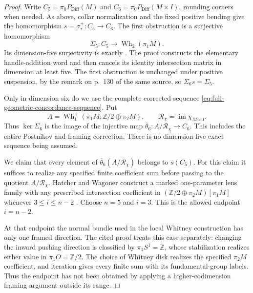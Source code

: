 \begin{proof}
Write $C_5=\pi_0P_{\mathrm{Diff}}(M)$ and
$C_6=\pi_0P_{\mathrm{Diff}}(M\times I)$, rounding corners when
needed. As above, collar normalization and the fixed positive bending
give the homomorphism $s=\sigma^+_*:C_5\to C_6$. The first
obstruction is a surjective homomorphism
\[
 \Sigma_5:C_5\longrightarrow\operatorname{Wh}_2(\pi_1M).
\]
Its dimension-five surjectivity is exactly
\cite[Part~I, Chapter~VI, Theorem~2 and its surjectivity proof,
p.~213]{HatcherWagoner1973}. The proof constructs the elementary
handle-addition word and then cancels its identity intersection
matrix in dimension at least five. The first obstruction is
unchanged under positive suspension, by the remark on p.~130 of
the same source, so $\Sigma_6s=\Sigma_5$.

Only in dimension six do we use the complete corrected sequence
\eqref{eq:full-geometric-concordance-sequence}. Put
\[
 A=\operatorname{Wh}_1^+
       (\pi_1M;\mathbb Z/2\oplus\pi_2M),\qquad
 \mathcal R_\chi=\operatorname{im}\chi_{M\times I}.
\]
Thus $\ker\Sigma_6$ is the image of the injective map
$\overline\theta_6:A/\mathcal R_\chi\to C_6$. This includes the entire
Postnikov and framing correction. There is no dimension-five
exact sequence being assumed.

We claim that every element of $\overline\theta_6(A/\mathcal R_\chi)$ belongs
to $s(C_5)$. For this claim it suffices to realize any specified
finite coefficient sum before passing to the quotient $A/\mathcal R_\chi$.
Hatcher and Wagoner construct a marked one-parameter lens family
with any prescribed intersection coefficient in
$(\mathbb Z/2\oplus\pi_2M)[\pi_1M]$ whenever
$3\leq i\leq n-2$
\cite[Part~I, Chapter~VII, Proposition~5 and its complete
construction, pp.~227--228]{HatcherWagoner1973}.
Choose $n=5$ and $i=3$. This is the allowed endpoint $i=n-2$.

At that endpoint the normal bundle used in the local Whitney
construction has only one framed direction. The cited proof treats
this case separately: changing the inward pushing direction is
classified by $\pi_1S^1=\mathbb Z$, whose stabilization realizes
either value in $\pi_1O=\mathbb Z/2$. The choice of Whitney disk
realizes the specified $\pi_2M$ coefficient, and iteration gives
every finite sum with its fundamental-group labels. Thus the
endpoint has not been obtained by applying a higher-codimension
framing argument outside its range.


\end{proof}
